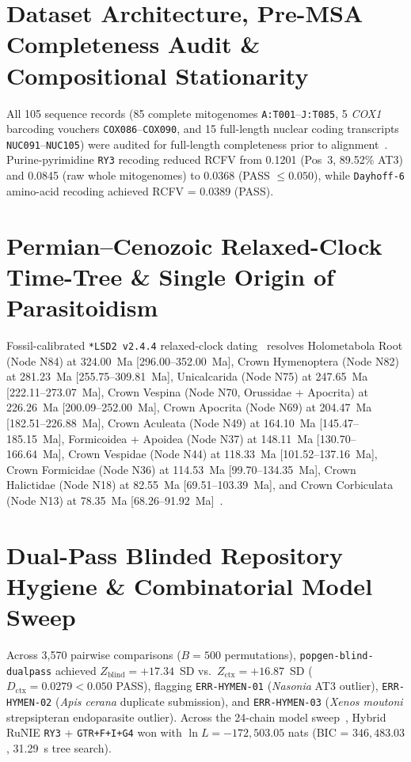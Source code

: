 \documentclass[10pt,letterpaper]{article}
\begin{document}
\section{Dataset Architecture, Pre-MSA Completeness Audit \& Compositional Stationarity}
All 105 sequence records (85 complete mitogenomes \texttt{A:T001}--\texttt{J:T085}, 5 \emph{COX1} barcoding vouchers \texttt{COX086}--\texttt{COX090}, and 15 full-length nuclear coding transcripts \texttt{NUC091}--\texttt{NUC105}) were audited for full-length completeness prior to alignment~\cite{katoh2013mafft,white2026hymenopterazenodo}. Purine-pyrimidine \texttt{RY3} recoding reduced RCFV from 0.1201 (Pos~3, 89.52\% AT3) and 0.0845 (raw whole mitogenomes) to 0.0368 (PASS $\le 0.050$), while \texttt{Dayhoff-6} amino-acid recoding achieved RCFV = 0.0389 (PASS).

\section{Permian--Cenozoic Relaxed-Clock Time-Tree \& Single Origin of Parasitoidism}
Fossil-calibrated \texttt{*LSD2 v2.4.4} relaxed-clock dating~\cite{ronquist2012total,vilhelmsen2010orussidae,misof2014phylogenomics,to2016lsd} resolves Holometabola Root (Node N84) at 324.00~Ma [296.00--352.00~Ma], Crown Hymenoptera (Node N82) at 281.23~Ma [255.75--309.81~Ma], Unicalcarida (Node N75) at 247.65~Ma [222.11--273.07~Ma], Crown Vespina (Node N70, Orussidae + Apocrita) at 226.26~Ma [200.09--252.00~Ma], Crown Apocrita (Node N69) at 204.47~Ma [182.51--226.88~Ma], Crown Aculeata (Node N49) at 164.10~Ma [145.47--185.15~Ma], Formicoidea + Apoidea (Node N37) at 148.11~Ma [130.70--166.64~Ma], Crown Vespidae (Node N44) at 118.33~Ma [101.52--137.16~Ma], Crown Formicidae (Node N36) at 114.53~Ma [99.70--134.35~Ma], Crown Halictidae (Node N18) at 82.55~Ma [69.51--103.39~Ma], and Crown Corbiculata (Node N13) at 78.35~Ma [68.26--91.92~Ma]~\cite{moreau2006ants,cardinal2013bees,piekarski2018vespidae,werren2010nasonia}.

\section{Dual-Pass Blinded Repository Hygiene \& Combinatorial Model Sweep}
Across 3,570 pairwise comparisons ($B = 500$ permutations), \texttt{popgen-blind-dualpass} achieved $Z_{\text{blind}} = +17.34$~SD vs.\ $Z_{\text{ctx}} = +16.87$~SD ($D_{\text{ctx}} = 0.0279 < 0.050$ PASS), flagging \texttt{ERR-HYMEN-01} (\emph{Nasonia} AT3 outlier), \texttt{ERR-HYMEN-02} (\emph{Apis cerana} duplicate submission), and \texttt{ERR-HYMEN-03} (\emph{Xenos moutoni} strepsipteran endoparasite outlier). Across the 24-chain model sweep~\cite{minh2020iqtree2,kalyaanamoorthy2017modelfinder,hoang2018ufboot2}, Hybrid RuNIE \texttt{RY3} + \texttt{GTR+F+I+G4} won with $\ln L = -172{,}503.05$ nats (BIC = $346{,}483.03$, 31.29~s tree search).
\end{document}
